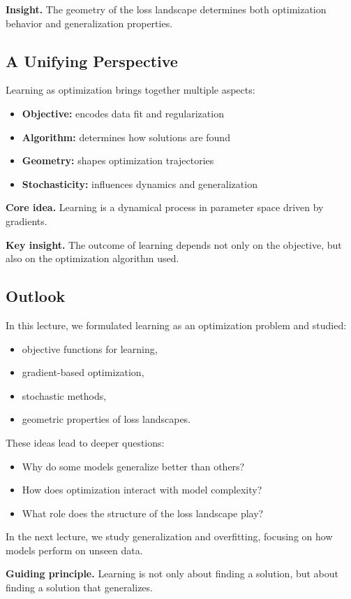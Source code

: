 \medskip

\noindent
\textbf{Insight.}  
The geometry of the loss landscape determines both optimization behavior and generalization properties.

\subsection{A Unifying Perspective}

Learning as optimization brings together multiple aspects:

\begin{itemize}
    \item \textbf{Objective:} encodes data fit and regularization
    \item \textbf{Algorithm:} determines how solutions are found
    \item \textbf{Geometry:} shapes optimization trajectories
    \item \textbf{Stochasticity:} influences dynamics and generalization
\end{itemize}

\medskip

\noindent
\textbf{Core idea.}  
Learning is a dynamical process in parameter space driven by gradients.

\medskip

\noindent
\textbf{Key insight.}  
The outcome of learning depends not only on the objective, but also on the optimization algorithm used.

\subsection{Outlook}

In this lecture, we formulated learning as an optimization problem and studied:

\begin{itemize}
    \item objective functions for learning,
    \item gradient-based optimization,
    \item stochastic methods,
    \item geometric properties of loss landscapes.
\end{itemize}

\medskip

\noindent
These ideas lead to deeper questions:

\begin{itemize}
    \item Why do some models generalize better than others?
    \item How does optimization interact with model complexity?
    \item What role does the structure of the loss landscape play?
\end{itemize}

\medskip

\noindent
In the next lecture, we study generalization and overfitting, focusing on how models perform on unseen data.

\medskip

\noindent
\textbf{Guiding principle.}  
Learning is not only about finding a solution, but about finding a solution that generalizes.